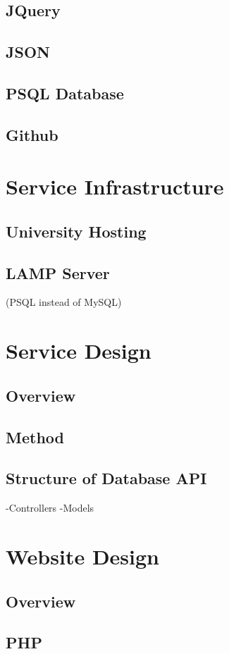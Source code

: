 	\subsection{JQuery}
	\subsection{JSON}
	\subsection{PSQL Database}
	\subsection{Github}
\section{Service Infrastructure}
	\subsection{University Hosting}
	\subsection{LAMP Server}
		(PSQL instead of MySQL)
\section{Service Design}
	\subsection{Overview}
	\subsection{Method}
	\subsection{Structure of Database API}
		-Controllers
		-Models
\section{Website Design}
	\subsection{Overview}
	\subsection{PHP}
